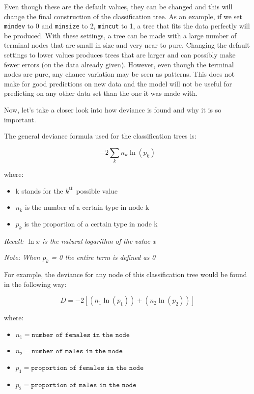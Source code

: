 \documentclass[12pt,twoside]{reedthesis}
\providecommand{\tightlist}{%
  \setlength{\itemsep}{0pt}\setlength{\parskip}{0pt}}
\begin{document}
  Even though these are the default values, they can be changed and this
  will change the final construction of the classification tree. As an
  example, if we set \texttt{mindev} to 0 and \texttt{minsize} to 2,
  \texttt{mincut} to 1, a tree that fits the data perfectly will be
  produced. With these settings, a tree can be made with a large number of
  terminal nodes that are small in size and very near to pure. Changing
  the default settings to lower values produces trees that are larger and
  can possibly make fewer errors (on the data already given). However,
  even though the terminal nodes are pure, any chance variation may be
  seen as patterns. This does not make for good predictions on new data
  and the model will not be useful for predicting on any other data set
  than the one it was made with.
  
  Now, let's take a closer look into how deviance is found and why it is
  so important.
  
  The general deviance formula used for the classification trees is:
  
  \[-2 \sum_{k}n_{k}\ln(p_{k})\]
  
  where:
  
  \begin{itemize}
  \tightlist
  \item
    k stands for the \(k^{\text{th}}\) possible value
  \item
    \(n_{k}\) is the number of a certain type in node k\\
  \item
    \(p_{k}\) is the proportion of a certain type in node k
  \end{itemize}
  
  \emph{Recall: \(\ln{x}\) is the natural logarithm of the value x}
  
  \emph{Note: When \(p_{k}\) = 0 the entire term is defined as 0}
  
  For example, the deviance for any node of this classification tree would
  be found in the following way:
  
  \[D = -2[(n_{1}\ln(p_{1})) + (n_{2}\ln(p_{2}))]\]
  
  where:
  
  \begin{itemize}
  \tightlist
  \item
    \(n_{1} = \texttt{number of females in the node}\)
  \item
    \(n_{2} = \texttt{number of males in the node}\)
  \item
    \(p_{1} = \texttt{proportion of females in the node}\)
  \item
    \(p_{2} = \texttt{proportion of males in the node}\)
  \end{itemize}
  
\end{document}
